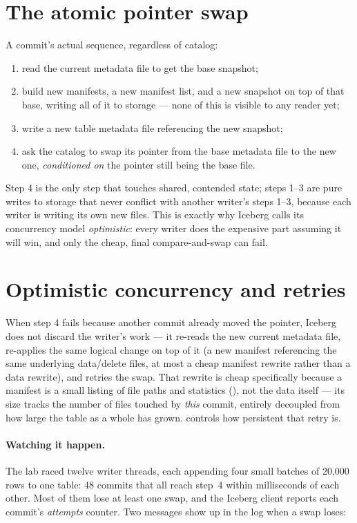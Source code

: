 \section{The atomic pointer swap}
\label{sec:cat-swap}

A commit's actual sequence, regardless of catalog:

\begin{enumerate}
  \item read the current metadata file to get the base snapshot;
  \item build new manifests, a new manifest list, and a new snapshot on top
        of that base, writing all of it to storage --- none of this is
        visible to any reader yet;
  \item write a new table metadata file referencing the new snapshot;
  \item ask the catalog to swap its pointer from the base metadata file to
        the new one, \emph{conditioned on} the pointer still being the base
        file.
\end{enumerate}

Step 4 is the only step that touches shared, contended state; steps 1--3 are
pure writes to storage that never conflict with another writer's steps 1--3,
because each writer is writing its own new files. This is exactly why
Iceberg calls its concurrency model \emph{optimistic}: every writer does the
expensive part assuming it will win, and only the cheap, final compare-and-swap
can fail.

\section{Optimistic concurrency and retries}
\label{sec:cat-retries}

When step 4 fails because another commit already moved the pointer, Iceberg
does not discard the writer's work --- it re-reads the new current metadata
file, re-applies the same logical change on top of it (a new manifest
referencing the same underlying data/delete files, at most a cheap manifest
rewrite rather than a data rewrite), and retries the swap. That rewrite is
cheap specifically because a manifest is a small listing of file paths and
statistics (), not the data itself --- its size tracks
the number of files touched by \emph{this} commit, entirely decoupled from
how large the table as a whole has grown. 
controls how persistent that retry is.

\paragraph{Watching it happen.} The lab raced twelve writer threads, each
appending four small batches of 20,000 rows to one table: 48 commits that all
reach step~4 within milliseconds of each other. Most of them lose at least one
swap, and the Iceberg client reports each commit's \emph{attempts} counter.
Two messages show up in the log when a swap loses:

